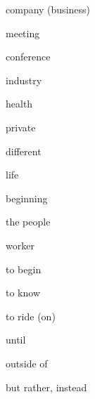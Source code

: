 \begin{flashcard}{\LARGE company (business)}
\LARGE {}
\end{flashcard}
\begin{flashcard}{\LARGE meeting}
\LARGE {}
\end{flashcard}
\begin{flashcard}{\LARGE conference}
\LARGE {}
\end{flashcard}
\begin{flashcard}{\LARGE industry}
\LARGE {}
\end{flashcard}
\begin{flashcard}{\LARGE health}
\LARGE {}
\end{flashcard}
\begin{flashcard}{\LARGE private}
\LARGE {}
\end{flashcard}
\begin{flashcard}{\LARGE different}
\LARGE {}
\end{flashcard}
\begin{flashcard}{\LARGE life}
\LARGE {}
\end{flashcard}
\begin{flashcard}{\LARGE beginning}
\LARGE {}
\end{flashcard}
\begin{flashcard}{\LARGE the people}
\LARGE {}
\end{flashcard}
\begin{flashcard}{\LARGE worker}
\LARGE {}
\end{flashcard}
\begin{flashcard}{\LARGE to begin}
\LARGE {}
\end{flashcard}
\begin{flashcard}{\LARGE to know}
\LARGE {}
\end{flashcard}
\begin{flashcard}{\LARGE to ride (on)}
\LARGE {}
\end{flashcard}
\begin{flashcard}{\LARGE until}
\LARGE {}
\end{flashcard}
\begin{flashcard}{\LARGE outside of}
\LARGE {}
\end{flashcard}
\begin{flashcard}{\LARGE but rather, instead}
\LARGE {}
\end{flashcard}

